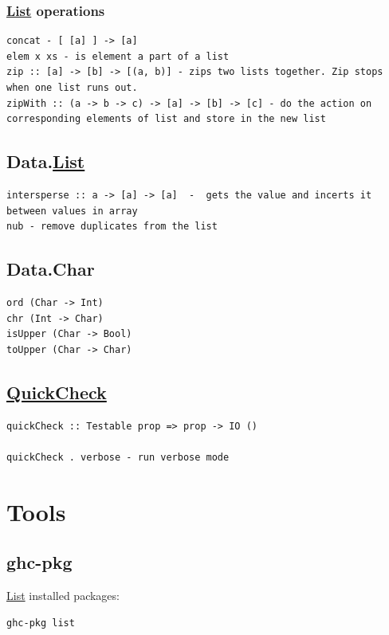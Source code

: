 \documentclass[11pt]{article}
\begin{document}
\subsubsection{\hyperref[org8ae0f28]{List} operations}
\label{sec:org48109d7}
\begin{verbatim}
concat - [ [a] ] -> [a]
elem x xs - is element a part of a list
zip :: [a] -> [b] -> [(a, b)] - zips two lists together. Zip stops when one list runs out.
zipWith :: (a -> b -> c) -> [a] -> [b] -> [c] - do the action on corresponding elements of list and store in the new list
\end{verbatim}

\subsection{Data.\hyperref[org8ae0f28]{List}}
\label{sec:org4afee1f}
\begin{verbatim}
intersperse :: a -> [a] -> [a]  -  gets the value and incerts it between values in array
nub - remove duplicates from the list
\end{verbatim}

\subsection{Data.Char}
\label{sec:orgc644647}
\begin{verbatim}
ord (Char -> Int)
chr (Int -> Char)
isUpper (Char -> Bool)
toUpper (Char -> Char)
\end{verbatim}

\subsection{\hyperref[org85396c2]{QuickCheck}}
\label{sec:org43abe42}
\begin{verbatim}
quickCheck :: Testable prop => prop -> IO ()

quickCheck . verbose - run verbose mode
\end{verbatim}

\section{Tools}
\label{sec:orgd3360b3}
\subsection{ghc-pkg}
\label{sec:org8ed943d}

\hyperref[org8ae0f28]{List} installed packages:\\
\begin{verbatim}
ghc-pkg list
\end{verbatim}
\end{document}
